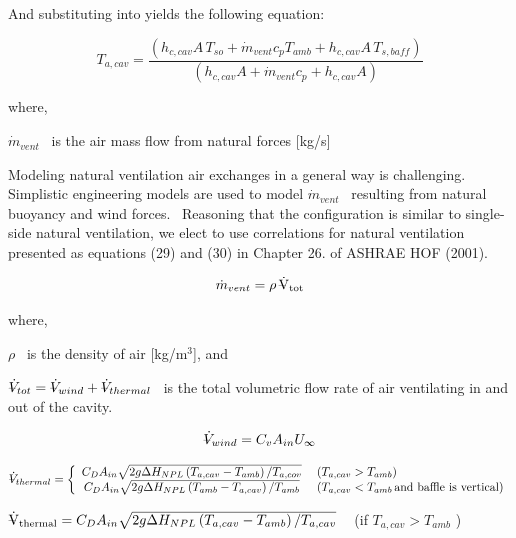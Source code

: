 And substituting into yields the following equation:

\begin{equation}
{T_{a,cav}} = \frac{{\left( {{h_{c,cav}}A\,{T_{so}} + {{\dot m}_{vent}}{c_p}{T_{amb}} + {h_{c,cav}}A\,{T_{s,baff}}} \right)}}{{\left( {{h_{c,cav}}A + {{\dot m}_{vent}}{c_p} + {h_{c,cav}}A} \right)}}
\end{equation}

where,

\({\dot m_{vent}}\) ~is the air mass flow from natural forces {[}kg/s{]}

Modeling natural ventilation air exchanges in a general way is challenging.~ Simplistic engineering models are used to model \({\dot m_{vent}}\) ~resulting from natural buoyancy and wind forces.~ Reasoning that the configuration is similar to single-side natural ventilation, we elect to use correlations for natural ventilation presented as equations (29) and (30) in Chapter 26. of ASHRAE HOF (2001).

\begin{equation}
{\dot m_{vent}} = \rho \,{{\rm{\rlap{--} \dot V}}_{{\rm{tot}}}}
\end{equation}

where,

\(\rho\) ~is the density of air {[}kg/m\(^{3}\){]}, and

\(\rlap{--} \dot{V}_{tot} = \rlap{--} \dot{V}_{wind} + \rlap{--} \dot{V}_{thermal}\) ~is the total volumetric flow rate of air ventilating in and out of the cavity.

\begin{equation}
\rlap{--} \dot{V}_{wind} = C_{v}A_{in}U_{\infty}
\end{equation}

\begin{equation}
\rlap{--} \dot{V}_{thermal} = \left\{
    \begin{array}{cl}
      C_{D}A_{in}\sqrt{2g\Delta H_{NPL}\left(T_{a,cav}-T_{amb}\right)/T_{a,cov}} & \; \left(T_{a,cav} > T_{amb}\right) \\
      C_{D}A_{in}\sqrt{2g\Delta H_{NPL}\left(T_{amb}-T_{a,cav}\right)/T_{amb}} & \; \left(T_{a,cav} < T_{amb}\,\text{and baffle is vertical}\right) 
    \end{array}
  \right.
\end{equation}

\({{\rm{\rlap{--} \dot V}}_{{\rm{thermal}}}} = {C_D}{A_{in}}\sqrt {2g\Delta {H_{NPL}}\left( {{T_{a,cav}} - {T_{amb}}} \right)/{T_{a,cav}}}\) ~ (if \(T_{a,cav} > T_{amb}\) )

